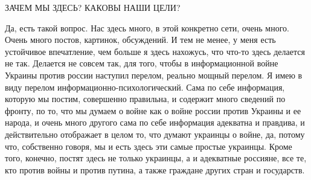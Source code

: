  
 
 
 
 

ЗАЧЕМ МЫ ЗДЕСЬ? КАКОВЫ НАШИ ЦЕЛИ?

Да, есть такой вопрос. Нас здесь много, в этой конкретно сети, очень много.
Очень много постов, картинок, обсуждений. И тем не менее, у меня есть
устойчивое впечатление, чем больше я здесь нахожусь, что что-то здесь делается
не так. Делается не совсем так, для того, чтобы в информационной войне Украины
против россии наступил перелом, реально мощный перелом. Я имею в виду перелом
информационно-психологический. Сама по себе информация, которую мы постим,
совершенно правильна, и содержит много сведений по фронту, по то, что мы думаем
о войне как о войне россии против Украины и ее народа, и очень много другого
сама по себе информация адекватна и правдива, и действительно отображает в
целом то, что думают украинцы о войне, да, потому что, собственно говоря, мы и
есть здесь эти самые простые украинцы. Кроме того, конечно, постят здесь не
только украинцы, а и адекватные россияне, все те, кто против войны и против
путина, а также граждане других стран и государств.

